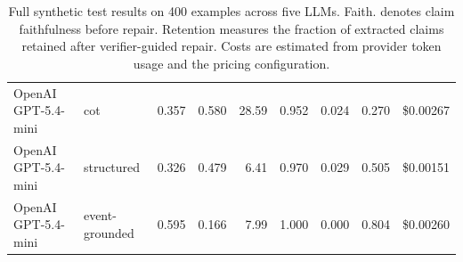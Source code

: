\begin{table}[t]
{\begin{tabular}{llrrrrrrr}
OpenAI GPT-5.4-mini & cot & 0.357 & 0.580 & 28.59 & 0.952 & 0.024 & 0.270 & \$0.00267 \\
OpenAI GPT-5.4-mini & structured & 0.326 & 0.479 & 6.41 & 0.970 & 0.029 & 0.505 & \$0.00151 \\
OpenAI GPT-5.4-mini & event-grounded & 0.595 & 0.166 & 7.99 & 1.000 & 0.000 & 0.804 & \$0.00260 \\
\bottomrule
\end{tabular}
}
\caption{Full synthetic test results on 400 examples across five LLMs. Faith. denotes claim faithfulness before repair. Retention measures the fraction of extracted claims retained after verifier-guided repair. Costs are estimated from provider token usage and the pricing configuration.}
\label{tab:full-results}
\end{table}
